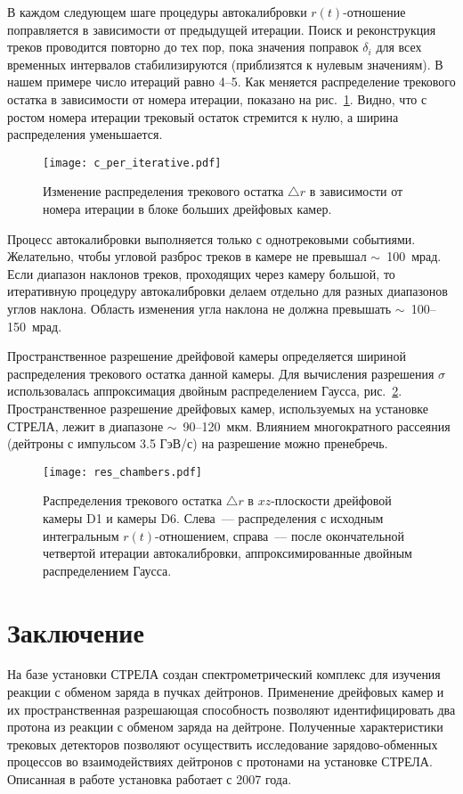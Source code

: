В каждом следующем шаге процедуры автокалибровки $r(t)$-отно\-шение поправляется
в зависимости от предыдущей итерации. Поиск и реконструкция треков проводится
повторно до тех пор, пока значения поправок $\delta_i$ для всех временных
интервалов стабилизируются (приблизятся к нулевым значениям). В нашем примере
число итераций равно 4--5. Как меняется распределение трекового остатка в
зависимости от номера итерации, показано на рис.~\ref{fig:per_iterative}.
Видно, что с ростом номера итерации трековый остаток стремится к нулю, а ширина
распределения уменьшается.

\begin{figure}[h]
  \centering
  \texttt{[image: c\_per\_iterative.pdf]}
  \caption{Изменение распределения трекового остатка $\triangle r$ в зависимости
    от номера итерации в блоке больших дрейфовых камер.}
  \label{fig:per_iterative}
\end{figure}

Процесс автокалибровки выполняется только с однотрековыми событиями. Желательно,
чтобы угловой разброс треков в камере не превышал $\sim$~100~мрад. Если диапазон
наклонов треков, проходящих через камеру большой, то итеративную процедуру
автокалибровки делаем отдельно для разных диапазонов углов наклона. Область
изменения угла наклона не должна превышать $\sim$~100--150~мрад.

Пространственное разрешение дрейфовой камеры определяется шириной распределения
трекового остатка данной камеры. Для вычисления разрешения $\sigma$
использовалась аппроксимация двойным распределением Гаусса,
рис.~\ref{fig:res_chambers}. Пространственное разрешение дрейфовых камер,
используемых на установке СТРЕЛА, лежит в диапазоне $\sim$~90--120~мкм.
Влиянием многократного рассеяния (дейтроны с импульсом 3.5 ГэВ/с) на разрешение
можно пренебречь.

\begin{figure}[h]
  \centering
  \texttt{[image: res\_chambers.pdf]}
  \caption{Распределения трекового остатка $\triangle r$ в $xz$-плоскости
    дрейфовой камеры D1 и камеры D6. Слева~--- распределения с исходным
    интегральным $r(t)$-отношением, справа~--- после окончательной четвертой
    итерации автокалибровки, аппроксимированные двойным распределением Гаусса.}
  \label{fig:res_chambers}
\end{figure}

\section{Заключение}
На базе установки СТРЕЛА создан спектрометрический комплекс для изучения реакции
с обменом заряда в пучках дейтронов. Применение дрейфовых камер и их
пространственная разрешающая способность позволяют идентифицировать два протона
из реакции с обменом заряда на дейтроне. Полученные характеристики трековых
детекторов позволяют осуществить исследование зарядово-обменных процессов во
взаимодействиях дейтронов с протонами на установке СТРЕЛА. Описанная в работе
установка работает с 2007 года.
